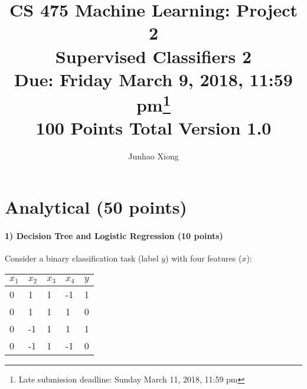 \documentclass[11pt]{article}
\title{CS 475 Machine Learning: Project 2\\Supervised Classifiers 2\\
\Large{Due: Friday March 9, 2018, 11:59 pm}\footnote{Late submission deadline: Sunday March 11, 2018, 11:59 pm}\\
100 Points Total \hspace{1cm} Version 1.0}
\author{Junhao Xiong}
\date{}
\begin{document}
\large
\maketitle
\thispagestyle{headings}

\vspace{-.5in}


\section{Analytical (50 points)}

\paragraph{1) Decision Tree and Logistic Regression (10 points)}
Consider a binary classification task (label $y$) with four features ($x$):

\begin{tabular}{ |l|l|l|l|l| }
\hline
$x_1$ & $x_2$ & $x_3$ & $x_4$ & $y$ \\
\hline
 0& 1 & 1& -1 & 1 \\
 0&  1 & 1& 1 & 0 \\
 0&  -1 & 1& 1 & 1 \\
 0&  -1 & 1& -1 & 0 \\
\hline
\end{tabular}
\end{document}
